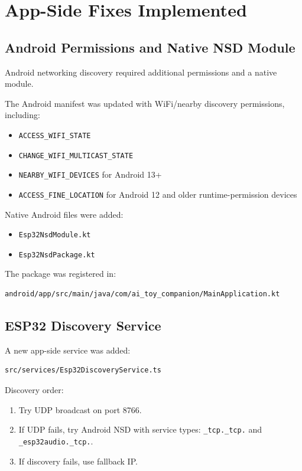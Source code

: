 \documentclass[11pt,a4paper]{article}
\begin{document}
\section{App-Side Fixes Implemented}

\subsection{Android Permissions and Native NSD Module}

Android networking discovery required additional permissions and a native module.

The Android manifest was updated with WiFi/nearby discovery permissions, including:

\begin{itemize}[leftmargin=*]
  \item \texttt{ACCESS\_WIFI\_STATE}
  \item \texttt{CHANGE\_WIFI\_MULTICAST\_STATE}
  \item \texttt{NEARBY\_WIFI\_DEVICES} for Android 13+
  \item \texttt{ACCESS\_FINE\_LOCATION} for Android 12 and older runtime-permission devices
\end{itemize}

Native Android files were added:

\begin{itemize}[leftmargin=*]
  \item \texttt{Esp32NsdModule.kt}
  \item \texttt{Esp32NsdPackage.kt}
\end{itemize}

The package was registered in:

\begin{lstlisting}[style=logstyle]
android/app/src/main/java/com/ai_toy_companion/MainApplication.kt
\end{lstlisting}

\subsection{ESP32 Discovery Service}

A new app-side service was added:

\begin{lstlisting}[style=logstyle]
src/services/Esp32DiscoveryService.ts
\end{lstlisting}

Discovery order:

\begin{enumerate}[leftmargin=*]
  \item Try UDP broadcast on port 8766.
  \item If UDP fails, try Android NSD with service types:
    \texttt{\_tcp.\_tcp.} and \texttt{\_esp32audio.\_tcp.}.
  \item If discovery fails, use fallback IP.
\end{enumerate}
\end{document}
